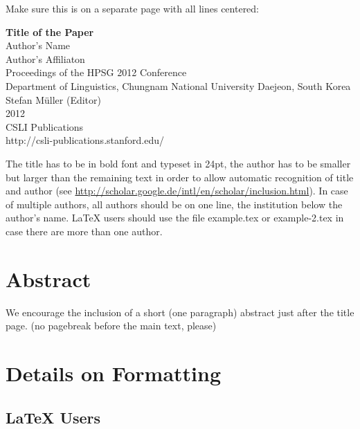 \documentclass[11pt,a4paper,fleqn]{article}
\begin{document}
Make sure this is on a separate page with all lines centered:

\begin{center}
{\Large
\bf Title of the Paper}\\[\baselineskip]

{\large Author's Name}\\[\baselineskip]
Author's Affiliaton\\[3\baselineskip]

                Proceedings of the HPSG 2012 Conference\\[\baselineskip]

Department of Linguistics, Chungnam National University Daejeon, South Korea\\[\baselineskip]

                        Stefan M{\"u}ller (Editor)\\[\baselineskip]

                                2012\\[\baselineskip]

                          CSLI Publications\\[\baselineskip]

              http://csli-publications.stanford.edu/

\end{center}

The title has to be in bold font and typeset in 24pt, the author has to be smaller but larger than
the remaining text in order to allow automatic recognition of title and author (see
\url{http://scholar.google.de/intl/en/scholar/inclusion.html}). In case of multiple authors, all authors should be on one line, the institution below the author's name.
\LaTeX{} users should use the file example.tex or example-2.tex in case there are more than one author.

\section{Abstract}

We encourage the inclusion of a short (one paragraph)  abstract just after the title page.
(no pagebreak before the main text, please)


\section{Details on Formatting}

\subsection{\LaTeX{} Users}
\end{document}
